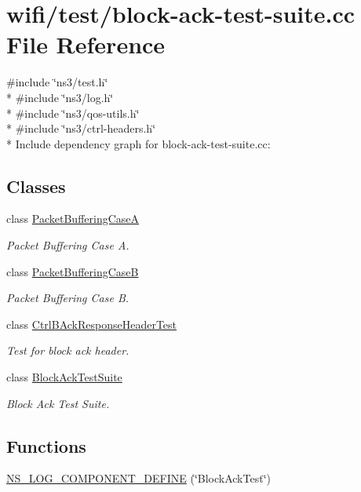 \hypertarget{block-ack-test-suite_8cc}{}\section{wifi/test/block-\/ack-\/test-\/suite.cc File Reference}
\label{block-ack-test-suite_8cc}
{\ttfamily \#include \char`\"{}ns3/test.\+h\char`\"{}}\\*
{\ttfamily \#include \char`\"{}ns3/log.\+h\char`\"{}}\\*
{\ttfamily \#include \char`\"{}ns3/qos-\/utils.\+h\char`\"{}}\\*
{\ttfamily \#include \char`\"{}ns3/ctrl-\/headers.\+h\char`\"{}}\\*
Include dependency graph for block-\/ack-\/test-\/suite.cc\+:
\subsection*{Classes}
\begin{DoxyCompactItemize}
\item 
class \hyperlink{classPacketBufferingCaseA}{Packet\+Buffering\+CaseA}
\begin{DoxyCompactList}\small\item\em Packet Buffering Case A. \end{DoxyCompactList}\item 
class \hyperlink{classPacketBufferingCaseB}{Packet\+Buffering\+CaseB}
\begin{DoxyCompactList}\small\item\em Packet Buffering Case B. \end{DoxyCompactList}\item 
class \hyperlink{classCtrlBAckResponseHeaderTest}{Ctrl\+B\+Ack\+Response\+Header\+Test}
\begin{DoxyCompactList}\small\item\em Test for block ack header. \end{DoxyCompactList}\item 
class \hyperlink{classBlockAckTestSuite}{Block\+Ack\+Test\+Suite}
\begin{DoxyCompactList}\small\item\em Block Ack Test Suite. \end{DoxyCompactList}\end{DoxyCompactItemize}
\subsection*{Functions}
\begin{DoxyCompactItemize}
\item 
\hyperlink{block-ack-test-suite_8cc_a1150b1a1d4b0cb4864ffe0a7374c1a5a}{N\+S\+\_\+\+L\+O\+G\+\_\+\+C\+O\+M\+P\+O\+N\+E\+N\+T\+\_\+\+D\+E\+F\+I\+NE} (\char`\"{}Block\+Ack\+Test\char`\"{})
\end{DoxyCompactItemize}
